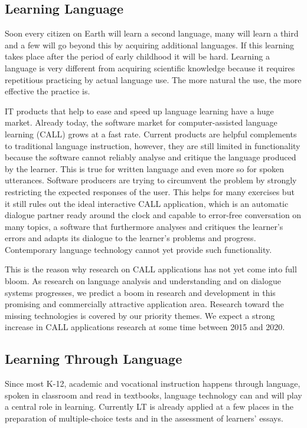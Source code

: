 \documentclass[10pt, plain]{../../metanetpaper}
\begin{document}
\begin{multicols}{2}
\subsection{Learning Language}
\label{sec:learning-language}

Soon every citizen on Earth will learn a second language, many will learn a third and a few will go beyond this by acquiring additional languages. If this learning takes place after the period of early childhood it will be hard. Learning a language is very different from acquiring scientific knowledge because it requires repetitious practicing by actual language use. The more natural the use, the more effective the practice is.
 
IT products that help to ease and speed up language learning have a huge market. Already today, the software market for computer-assisted language learning (CALL) grows at a fast rate. Current products are helpful complements to traditional language instruction, however, they are still limited in functionality because the software cannot reliably analyse and critique the language produced by the learner. This is true for written language and even more so for spoken utterances. Software producers are trying to circumvent the problem by strongly restricting the expected responses of the user. This helps for many exercises but it still rules out the ideal interactive CALL application, which is an automatic dialogue partner ready around the clock and capable to error-free conversation on many topics, a software that furthermore analyses and critiques the learner’s errors and adapts its dialogue to the learner’s problems and progress. Contemporary language technology cannot yet provide such functionality.
 
This is the reason why research on CALL applications has not yet come into full bloom. As research on language analysis and understanding and on dialogue systems progresses, we predict a boom in research and development in this promising and commercially attractive application area. Research toward the missing technologies is covered by our priority themes. We expect a strong increase in CALL applications research at some time between 2015 and 2020.

\subsection{Learning Through Language}
\label{sec:learn-thro-lang}

Since most K-12, academic and vocational instruction happens through language, spoken in classroom and read in textbooks, language technology can and will play a central role in learning. Currently LT is already applied at a few places in the preparation of multiple-choice tests and in the assessment of learners’ essays.
 

\end{multicols}
\end{document}
